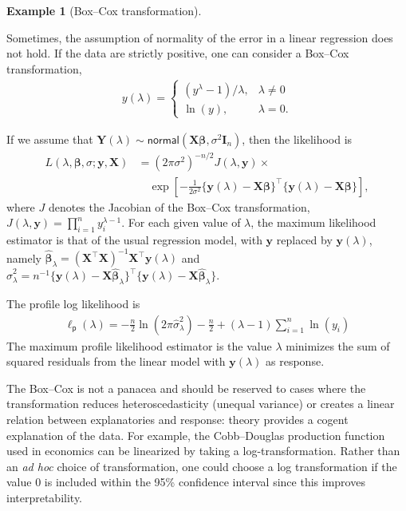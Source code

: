 \documentclass[
  11pt,
  letterpaper,
]{scrbook}
\theoremstyle{definition}
\theoremstyle{definition}
\newtheorem{example}{Example}[chapter]
\theoremstyle{plain}
\theoremstyle{remark}
\begin{document}
\begin{example}[Box--Cox
transformation]\protect\hypertarget{exm-boxcox}{}\label{exm-boxcox}

Sometimes, the assumption of normality of the error in a linear
regression does not hold. If the data are strictly positive, one can
consider a Box--Cox transformation, \begin{align*}
y(\lambda)= \begin{cases}
(y^{\lambda}-1)/\lambda, & \lambda \neq 0\\
\ln(y), & \lambda=0.
\end{cases}
\end{align*}

If we assume that
\(\boldsymbol{Y}(\lambda) \sim \mathsf{normal}(\mathbf{X}\boldsymbol{\beta}, \sigma^2 \mathbf{I}_n)\),
then the likelihood is \begin{align*}
L(\lambda, \boldsymbol{\beta}, \sigma; \boldsymbol{y}, \mathbf{X}) &= (2\pi\sigma^2)^{-n/2} J(\lambda, \boldsymbol{y}) \times\\& \quad \exp \left[ - \frac{1}{2\sigma^2}\{\boldsymbol{y}(\lambda) - \mathbf{X}\boldsymbol{\beta}\}^\top\{\boldsymbol{y}(\lambda) - \mathbf{X}\boldsymbol{\beta}\}\right],
\end{align*} where \(J\) denotes the Jacobian of the Box--Cox
transformation,
\(J(\lambda, \boldsymbol{y})=\prod_{i=1}^n y_i^{\lambda-1}\). For each
given value of \(\lambda\), the maximum likelihood estimator is that of
the usual regression model, with \(\boldsymbol{y}\) replaced by
\(\boldsymbol{y}(\lambda)\), namely
\(\widehat{\boldsymbol{\beta}}_\lambda = (\mathbf{X}^\top\mathbf{X})^{-1}\mathbf{X}^\top \boldsymbol{y}(\lambda)\)
and
\(\widehat{\sigma}^2_\lambda = n^{-1}\{ \boldsymbol{y}(\lambda) - \mathbf{X}\widehat{\boldsymbol{\beta}}_\lambda\}^\top\{ \boldsymbol{y}(\lambda) - \mathbf{X}\widehat{\boldsymbol{\beta}}_\lambda\}\).

The profile log likelihood is \begin{align*}
\ell_{\mathsf{p}}(\lambda) = -\frac{n}{2}\ln(2\pi \widehat{\sigma}^2_\lambda) - \frac{n}{2} + (\lambda - 1)\sum_{i=1}^n \ln(y_i)
\end{align*} The maximum profile likelihood estimator is the value
\(\lambda\) minimizes the sum of squared residuals from the linear model
with \(\boldsymbol{y}(\lambda)\) as response.

The Box--Cox is not a panacea and should be reserved to cases where the
transformation reduces heteroscedasticity (unequal variance) or creates
a linear relation between explanatories and response: theory provides a
cogent explanation of the data. For example, the Cobb--Douglas
production function used in economics can be linearized by taking a
log-transformation. Rather than an \emph{ad hoc} choice of
transformation, one could choose a log transformation if the value \(0\)
is included within the 95\% confidence interval since this improves
interpretability.

\end{example}
\end{document}
